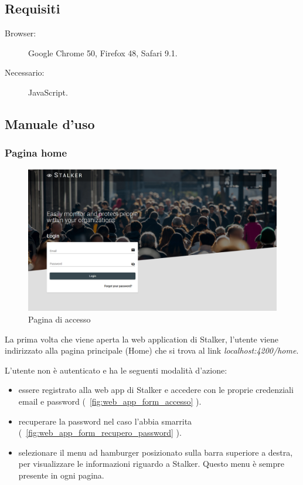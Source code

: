\documentclass[../manuale-utente.tex]{subfiles}
\begin{document}
\subsection{Requisiti}%
\label{sub:requisiti}

\begin{description}
    \item[Browser:] Google Chrome 50, Firefox 48, Safari 9.1.
    \item[Necessario:] JavaScript.
\end{description}
\newpage

\subsection{Manuale d'uso}%
\label{sub:manuale-uso-web}

\subsubsection{Pagina home}%
\label{subs:pagina_home}

\begin{figure}[H]
    \centering
    \includegraphics[width=175mm]{img/web-app/pagina-home.png}
    \caption{Pagina di accesso}%
    \label{fig:web_app_pagina_accesso}
\end{figure}

La prima volta che viene aperta la web application di Stalker, l'utente viene indirizzato alla pagina principale (Home) che si trova al link \textit{localhost:4200/home}.

L'utente non è autenticato e ha le seguenti modalità d'azione:
\begin{itemize}
    \item essere registrato alla web app di Stalker e accedere con le proprie credenziali email e password (~\ref{fig:web_app_form_accesso} ).
    \item recuperare la password nel caso l'abbia smarrita (~\ref{fig:web_app_form_recupero_password} ).
    \item selezionare il menu ad hamburger posizionato sulla barra superiore a destra, per visualizzare le informazioni riguardo a Stalker. Questo menu è sempre presente in ogni pagina.
\end{itemize} 
\newpage
\end{document}
